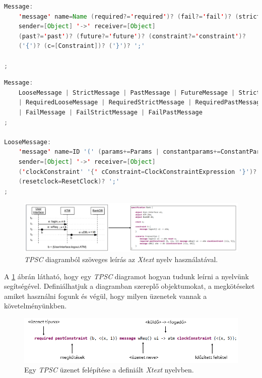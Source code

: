 \begin{lstlisting}[language=java, frame=single, float=ht!, caption={Eredeti \textit{Message} nyelvtani szabály \cite{Bakai}.},captionpos=b,label=minotor_message_original]
Message:
    'message' name=Name (required?='required')? (fail?='fail')? (strict?='strict')?
    sender=[Object] '->' receiver=[Object]
    (past?='past')? (future?='future')? (constraint?='constraint')?
    ('{')? (c=[Constraint])? ('}')? ';'

;
\end{lstlisting}

\begin{lstlisting}[language=java, frame=single, float=ht!, caption={Kibővített \textit{Message} nyelvtani szabály.},captionpos=b,label=minotor_message]
Message:
	LooseMessage | StrictMessage | PastMessage | FutureMessage | StrictFutureMessage
	| RequiredLooseMessage | RequiredStrictMessage | RequiredPastMessage | RequiredFutureMessage | RequiredStrictFutureMessage
	| FailMessage | FailStrictMessage | FailPastMessage
;

LooseMessage:
	'message' name=ID '(' (params+=Params | constantparams+=ConstantParams) ')'
	sender=[Object] '->' receiver=[Object]
	('clockConstraint' '{' cConstraint=ClockConstraintExpression '}')?
	(resetclock=ResetClock)? ';'
;
\end{lstlisting}

\begin{figure}[!ht]
    \centering
    \includegraphics[width=150mm, keepaspectratio]{figures/11abra.png}
    \caption{\textit{TPSC} diagramból szöveges leírás az \textit{Xtext} nyelv használatával.}
    \label{xtext_language_example}
\end{figure}

A \ref{xtext_language_example} ábrán látható, hogy egy \textit{TPSC} diagramot hogyan tudunk leírni a nyelvünk segítségével.
Definiálhatjuk a diagramban szereplő objektumokat, a megkötéseket amiket használni fogunk és végül, hogy milyen üzenetek vannak a követelményünkben.

\begin{figure}[!ht]
    \centering
    \includegraphics[width=150mm, keepaspectratio]{figures/12abra.png}
    \caption{Egy \textit{TPSC} üzenet felépítése a definiált \textit{Xtext} nyelvben.}
    \label{xtext_message}
\end{figure}

